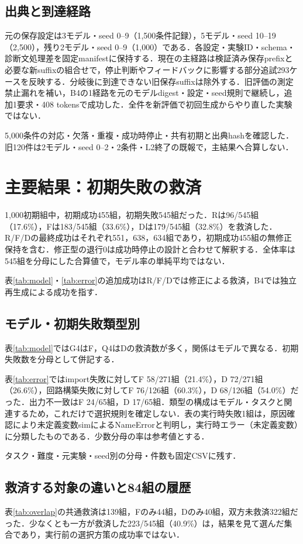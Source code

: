 \documentclass[a4paper,8pt,twocolumn]{extarticle}
\begin{document}
\subsection{出典と到達経路}
元の保存設定は3モデル・seed 0--9（1,500条件記録），5モデル・seed 10--19（2,500），残り2モデル・seed 0--9（1,000）である．各設定・実験ID・schema・診断文処理差を固定manifestに保持する\cite{data}．現在の主経路は検証済み保存prefixと必要な新suffixの組合せで，停止判断やフィードバックに影響する部分追試293ケースを反映する．分岐後に到達できない旧保存suffixは除外する．旧評価の測定禁止漏れを補い，B4の1経路を元のモデルdigest・設定・seed規則で継続し，追加1要求・408 tokensで成功した．全件を新評価で初回生成からやり直した実験ではない．

5,000条件の対応・欠落・重複・成功時停止・共有初期と出典hashを確認した．旧120件は2モデル・seed 0--2・2条件・L2終了の既報で，主結果へ合算しない．

\section{主要結果：初期失敗の救済}
1,000初期組中，初期成功455組，初期失敗545組だった．Rは96/545組（17.6\%），Fは183/545組（33.6\%），Dは179/545組（32.8\%）を救済した．R/F/Dの最終成功はそれぞれ551，638，634組であり，初期成功455組の無修正保持を含む．修正型の退行0は成功時停止の設計と合わせて解釈する．全体率は545組を分母にした合算値で，モデル率の単純平均ではない．


表\ref{tab:model}・\ref{tab:error}の追加成功はR/F/Dでは修正による救済，B4では独立再生成による成功を指す．

\subsection{モデル・初期失敗類型別}
表\ref{tab:model}ではG4はF，Q4はDの救済数が多く，関係はモデルで異なる．初期失敗数を分母として併記する．

表\ref{tab:error}ではimport失敗に対してF 58/271組（21.4\%），D 72/271組（26.6\%），回路構築失敗に対してF 76/126組（60.3\%），D 68/126組（54.0\%）だった．出力不一致はF 24/65組，D 17/65組．類型の構成はモデル・タスクと関連するため，これだけで選択規則を確定しない．表の実行時失敗1組は，原因確認により未定義変数simによるNameErrorと判明し，実行時エラー（未定義変数）に分類したものである．少数分母の率は参考値とする．

タスク・難度・元実験・seed別の分母・件数も固定CSVに残す．

\subsection{救済する対象の違いと84組の履歴}
表\ref{tab:overlap}の共通救済は139組，Fのみ44組，Dのみ40組，双方未救済322組だった．少なくとも一方が救済した223/545組（40.9\%）は，結果を見て選んだ集合であり，実行前の選択方策の成功率ではない．
\end{document}
